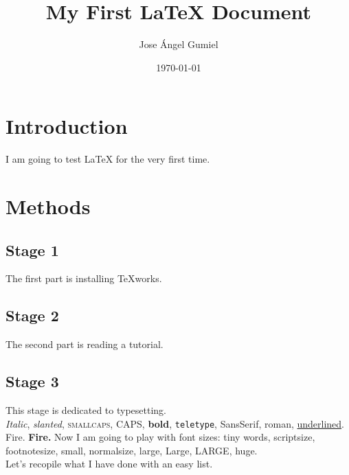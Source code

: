\documentclass[a4paper,12pt]{article}
\begin{document}
	\title{My First LaTeX Document}
	\author{Jose Ángel Gumiel}
	\date{\today}
	\maketitle
	
	
	\tableofcontents
	\newpage
	
	\section{Introduction}
	I am going to test LaTeX for the very first time.
	
	\section{Methods}
		\subsection{Stage 1}
		\label{sec1}
		The first part is installing TeXworks.
		
		\subsection{Stage 2}
		The second part is reading a tutorial.
		
		\subsection{Stage 3}
		This stage is dedicated to typesetting.\\
		\textit{Italic}, \textsl{slanted}, \textsc{ smallcaps}, CAPS, \textbf{bold}, \texttt{teletype}, \textsf{SansSerif}, \textrm{roman}, \underline{underlined}.\newline
		{\color{red}Fire.}\break
		\textbf{{\color{red}Fire.}} \break
		Now I am going to play with font sizes:
		{\tiny tiny words}, {\scriptsize scriptsize}, {\footnotesize footnotesize}, {\small small}, {\normalsize normalsize}, {\large large}, {\Large Large}, {\LARGE LARGE}, {\huge huge}.\\
		
		Let's recopile what I have done with an easy list.
		
\end{document}
